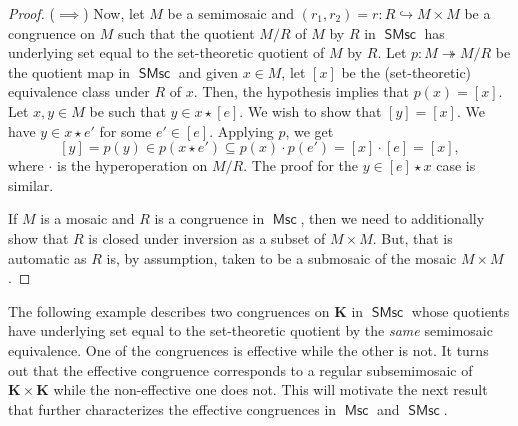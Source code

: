 \documentclass[reqno]{amsart}
\newcommand{\cat}[1]{\ensuremath{\mathsf{#1}}}
\DeclareMathOperator{\Msc}{\cat{Msc}}
\DeclareMathOperator{\SMsc}{\cat{SMsc}}
\newcommand{\K}{\mathbf{K}}
\numberwithin{equation}{section}
\theoremstyle{plain}
\theoremstyle{definition}
\begin{document}
\begin{proof}
($\implies$) Now, let $M$ be a semimosaic and $(r_1, r_2)=r:R\hookrightarrow M\times M$ be a congruence on $M$ such that the quotient $M/R$ of $M$ by $R$ in $\SMsc$ has underlying set equal to the set-theoretic quotient of $M$ by $R$. Let $p:M\twoheadrightarrow M/R$ be the quotient map in $\SMsc$ and given $x\in M$, let $[x]$ be the (set-theoretic) equivalence class under $R$ of $x$. Then, the hypothesis implies that $p(x)=[x]$. Let $x, y\in M$ be such that $y\in x\star[e]$. We wish to show that $[y]=[x]$. We have $y\in x\star e'$ for some $e' \in [e]$. Applying $p$, we get
$$[y]=p(y) \in p(x\star e') \subseteq p(x)\cdot p(e') = [x]\cdot [e] = [x],$$
where $\cdot$ is the hyperoperation on $M/R$. The proof for the $y\in [e]\star x$ case is similar. 

If $M$ is a mosaic and $R$ is a congruence in $\Msc$, then we need to additionally show that $R$ is closed under inversion as a subset of $M\times M$. But, that is automatic as $R$ is, by assumption, taken to be a submosaic of the mosaic $M\times M$.
\end{proof}

The following example describes two congruences on $\K$ in $\SMsc$ whose quotients have underlying set equal to the set-theoretic quotient by the \textit{same} semimosaic equivalence. One of the congruences is effective while the other is not. It turns out that the effective congruence corresponds to a regular subsemimosaic of $\K\times \K$ while the non-effective one does not. This will motivate the next result that further characterizes the effective congruences in $\Msc$ and $\SMsc$.
\end{document}
